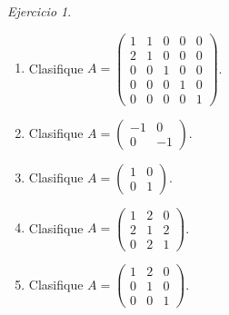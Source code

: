 \documentclass[12pt]{article}
\theoremstyle{remark}
\newtheorem{Ejer}[definicion]{Ejercicio}
\begin{document}
\begin{Ejer}
\begin{enumerate}[start=59]
\item Clasifique $A=\begin{pmatrix}1&1&0&0&0\\2&1&0&0&0\\0&0&1&0&0\\0&0&0&1&0\\0&0&0&0&1\end{pmatrix}$.

\item Clasifique $A=\begin{pmatrix}-1&0\\0&-1\end{pmatrix}$.

\item Clasifique $A=\begin{pmatrix}1&0\\0&1\end{pmatrix}$.

\item Clasifique $A=\begin{pmatrix}1&2&0\\2&1&2\\0&2&1\end{pmatrix}$.

\item Clasifique $A=\begin{pmatrix}1&2&0\\0&1&0\\0&0&1\end{pmatrix}$.

\end{enumerate}
\end{Ejer}
\end{document}
